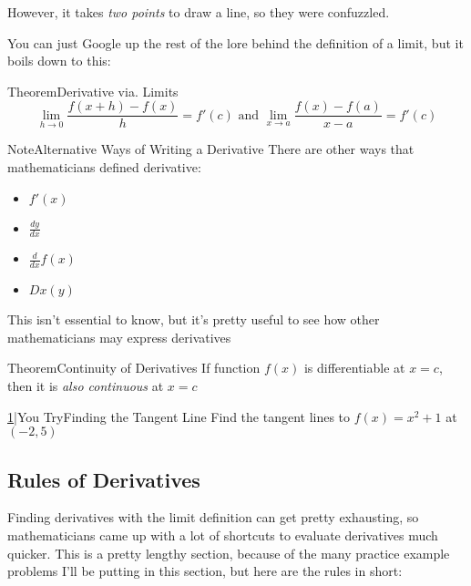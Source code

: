 \documentclass{MathNotes}
\newenvironment{note}[1]
{\begin{YellowBox}{Note}{#1}}{\end{YellowBox}}
\newenvironment{theorem}[1]
{\begin{GrayBox}{Theorem}{#1}}{\end{GrayBox}}
\newenvironment{practice}[2]
{\begin{PurpleBox}{\texorpdfstring{#1}\Big|You Try}{#2}}{\end{PurpleBox}}
\begin{document}
However, it takes \textit{two points} to draw a line, so they were confuzzled.

You can just Google up the rest of the lore behind the definition of a limit, 
but it boils down to this:
\begin{theorem}{Derivative via. Limits}
    \begin{displaymath}
        \lim_{h\to 0}\frac{f(x+h)-f(x)}{h}=f'(c)\text{ and }
        \lim_{x\to a}\frac{f(x)-f(a)}{x-a}=f'(c)
    \end{displaymath}
\end{theorem}

\begin{note}{Alternative Ways of Writing a Derivative}
There are other ways that mathematicians defined derivative:
\begin{multicols}{2}[]
    \begin{itemize}
        \item $f'(x)$
        \item $\frac{dy}{dx}$
        \item $\frac{d}{dx}f(x)$
        \item $Dx(y)$
    \end{itemize}
\end{multicols}
This isn't essential to know, but it's pretty useful to see how other
mathematicians may express derivatives
\end{note}

\begin{theorem}{Continuity of Derivatives}
    If function $f(x)$ is differentiable at $x=c$, then it is 
    \textit{also continuous} at $x=c$
\end{theorem}

\begin{practice}{\hyperref[ans:2.1-1]{1}}{Finding the Tangent Line}\label{prac:2.1-1}
    Find the tangent lines to $f(x)=x^2+1$ at $(-2, 5)$
\end{practice}

\subsection{Rules of Derivatives}
Finding derivatives with the limit definition can get pretty exhausting, so
mathematicians came up with a lot of shortcuts to evaluate derivatives much
quicker. This is a pretty lengthy section, because of the many practice example 
problems I'll be putting in this section, but here are the rules in short:
\end{document}
